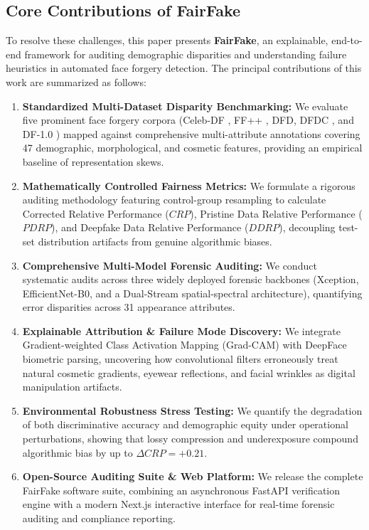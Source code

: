 \documentclass[journal]{IEEEtran}
\begin{document}
\subsection{Core Contributions of FairFake}
To resolve these challenges, this paper presents \textbf{FairFake}, an explainable, end-to-end framework for auditing demographic disparities and understanding failure heuristics in automated face forgery detection. The principal contributions of this work are summarized as follows:
\begin{enumerate}
    \item \textbf{Standardized Multi-Dataset Disparity Benchmarking:} We evaluate five prominent face forgery corpora (Celeb-DF \cite{li2020celebdf}, FF++ \cite{rossler2019faceforensics}, DFD, DFDC \cite{dolhansky2020deepfake}, and DF-1.0 \cite{jiang2020deeperforensics}) mapped against comprehensive multi-attribute annotations covering 47 demographic, morphological, and cosmetic features, providing an empirical baseline of representation skews.
    \item \textbf{Mathematically Controlled Fairness Metrics:} We formulate a rigorous auditing methodology featuring control-group resampling to calculate Corrected Relative Performance ($CRP$), Pristine Data Relative Performance ($PDRP$), and Deepfake Data Relative Performance ($DDRP$), decoupling test-set distribution artifacts from genuine algorithmic biases.
    \item \textbf{Comprehensive Multi-Model Forensic Auditing:} We conduct systematic audits across three widely deployed forensic backbones (Xception, EfficientNet-B0, and a Dual-Stream spatial-spectral architecture), quantifying error disparities across 31 appearance attributes.
    \item \textbf{Explainable Attribution \& Failure Mode Discovery:} We integrate Gradient-weighted Class Activation Mapping (Grad-CAM) \cite{selvaraju2017gradcam} with DeepFace biometric parsing, uncovering how convolutional filters erroneously treat natural cosmetic gradients, eyewear reflections, and facial wrinkles as digital manipulation artifacts.
    \item \textbf{Environmental Robustness Stress Testing:} We quantify the degradation of both discriminative accuracy and demographic equity under operational perturbations, showing that lossy compression and underexposure compound algorithmic bias by up to $\Delta CRP = +0.21$.
    \item \textbf{Open-Source Auditing Suite \& Web Platform:} We release the complete FairFake software suite, combining an asynchronous FastAPI verification engine with a modern Next.js interactive interface for real-time forensic auditing and compliance reporting.
\end{enumerate}
\end{document}
